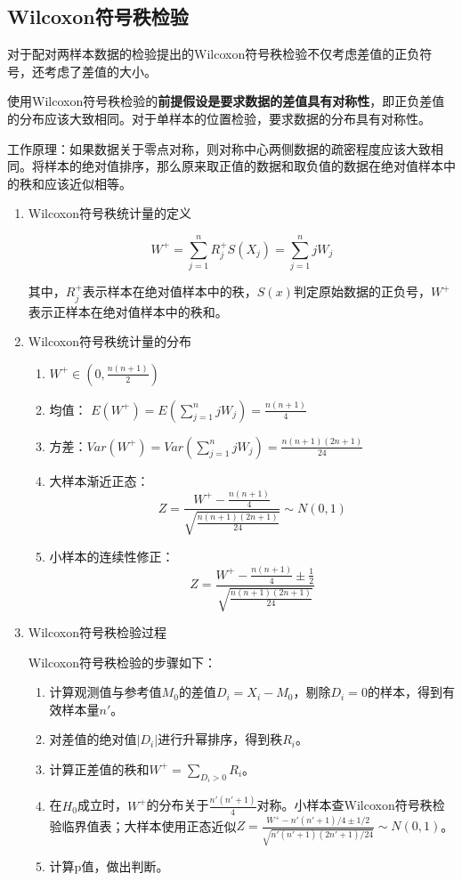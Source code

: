 \documentclass[
]{book}
\providecommand{\tightlist}{%
  \setlength{\itemsep}{0pt}\setlength{\parskip}{0pt}}
\begin{document}
\subsection{Wilcoxon符号秩检验}\label{wilcoxonux7b26ux53f7ux79e9ux68c0ux9a8c}

对于配对两样本数据的检验提出的Wilcoxon符号秩检验不仅考虑差值的正负符号，还考虑了差值的大小。

使用Wilcoxon符号秩检验的\textbf{前提假设是要求数据的差值具有对称性}，即正负差值的分布应该大致相同。对于单样本的位置检验，要求数据的分布具有对称性。

工作原理：如果数据关于零点对称，则对称中心两侧数据的疏密程度应该大致相同。将样本的绝对值排序，那么原来取正值的数据和取负值的数据在绝对值样本中的秩和应该近似相等。

\begin{enumerate}
\def\labelenumi{\arabic{enumi}.}
\item
  Wilcoxon符号秩统计量的定义

  \[
  W^+ = \sum_{j=1}^nR_j^+S(X_j) = \sum_{j=1}^njW_j
  \]

  其中，\(R^+_j\)表示样本在绝对值样本中的秩，\(S(x)\)判定原始数据的正负号，\(W^+\)表示正样本在绝对值样本中的秩和。
\item
  Wilcoxon符号秩统计量的分布

  \begin{enumerate}
  \def\labelenumii{\arabic{enumii}.}
  \tightlist
  \item
    \(W^+\in (0,\frac{n(n+1)}{2})\)
  \item
    均值： \(E(W^+) = E(\sum_{j=1}^n jW_j) = \frac{n(n+1)}{4}\)
  \item
    方差：\(Var(W^+)=Var(\sum_{j=1}^njW_j)=\frac{n(n+1)(2n+1)}{24}\)
  \item
    大样本渐近正态：\[
    Z = \frac{W^+-\frac{n(n+1)}{4}}{\sqrt{\frac{n(n+1)(2n+1)}{24}}}
    \sim N(0,1)
    \]
  \item
    小样本的连续性修正：\[
    Z = \frac{W^+-\frac{n(n+1)}{4}\pm \frac{1}{2}}{\sqrt{\frac{n(n+1)(2n+1)}{24}}}
    \]
  \end{enumerate}
\item
  Wilcoxon符号秩检验过程

  Wilcoxon符号秩检验的步骤如下：

  \begin{enumerate}
  \def\labelenumii{\arabic{enumii}.}
  \item
    计算观测值与参考值\(M_0\)的差值\(D_i = X_i - M_0\)，剔除\(D_i = 0\)的样本，得到有效样本量\(n'\)。
  \item
    对差值的绝对值\(|D_i|\)进行升幂排序，得到秩\(R_i\)。
  \item
    计算正差值的秩和\(W^+ = \sum_{D_i > 0} R_i\)。
  \item
    在\(H_0\)成立时，\(W^+\)的分布关于\(\frac{n'(n'+1)}{4}\)对称。小样本查Wilcoxon符号秩检验临界值表；大样本使用正态近似\(Z = \frac{W^+ - n'(n'+1)/4 \pm 1/2}{\sqrt{n'(n'+1)(2n'+1)/24}} \sim N(0,1)\)。
  \item
    计算p值，做出判断。
  \end{enumerate}


\end{enumerate}
\end{document}
